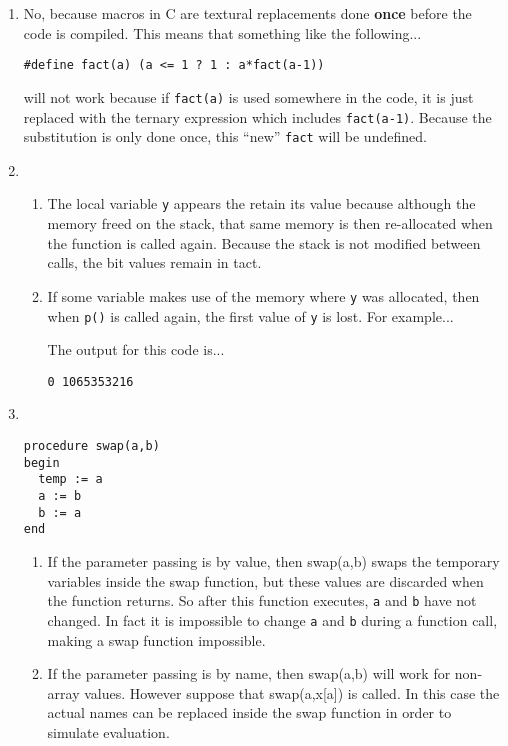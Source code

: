 %

\begin{enumerate}
\item %
No, because macros in C are textural replacements done {\bf once} before the code is compiled.
This means that something like the following...

\vspace{20pt}
{\tt \#define fact(a) (a <= 1 ? 1 : a*fact(a-1))}
\vspace{20pt}

  will not work because if {\tt fact(a)} is used somewhere in the code, it is just replaced with
  the ternary expression which includes {\tt fact(a-1)}.  Because the substitution is only done
  once, this ``new'' {\tt fact} will be undefined.

\item %
\begin{enumerate}
  \item %
    The local variable {\tt y} appears the retain its value because although the memory freed on
    the stack, that same memory is then re-allocated when the function is called again.  Because
    the stack is not modified between calls, the bit values remain in tact.
  \item %
    If some variable makes use of the memory where {\tt y} was allocated, then when {\tt p()} is
    called again, the first value of {\tt y} is lost.  For example...

    

    The output for this code is...

    \vspace{20pt}
    {\tt 0 1065353216}
    \vspace{20pt}

\end{enumerate}

\newpage

\item %
{\tt
\begin{verbatim}
procedure swap(a,b)
begin
  temp := a
  a := b
  b := a
end

\end{verbatim}
}
\begin{enumerate}
  \item
    If the parameter passing is by value, then swap(a,b) swaps the temporary variables inside
    the swap function, but these values are discarded when the function returns.  So after this
    function executes, {\tt a} and {\tt b} have not changed.  In fact it is impossible to change
    {\tt a} and {\tt b} during a function call, making a swap function impossible.
  \item
    If the parameter passing is by name, then swap(a,b) will work for non-array values.  However
    suppose that swap(a,x[a]) is called.  In this case the actual names can be replaced inside
    the swap function in order to simulate evaluation.
{\tt

}
\end{enumerate}
\end{enumerate}
